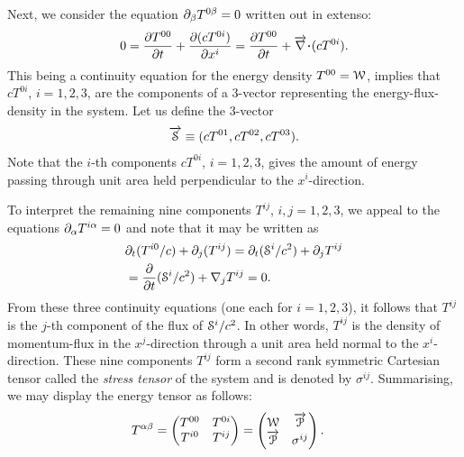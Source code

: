 Next, we consider the equation $\dow_\gkb T^{0\gkb}=0 $
written out in extenso:
\begin{align} \label{rcm.26}
0=\frac{\dow T^{00}}{\dow t} + \frac{\dow(c
T^{0i})}{\dow x^i}=\frac{\dow T^{00}}{\dow t} +
\vnab\dotp (cT^{0i}).
\end{align}
This being  a {continuity equation} for the energy density 
$T^{00}= \EuScript{W}$, implies that $c T^{0i}$, $i=1,2,3$, 
are the components of a {3-vector} representing the 
{energy-flux-density} in the system. Let  us define the 
3-vector   
\begin{align} \label{rcm.27} \vec{\EuScript{S}} \equiv 
(cT^{01},cT^{02},cT^{03}). \end{align} Note that the $i$-th 
components $c T^{0i} $, $i=1,2,3$, gives the amount of 
energy passing through unit area held  perpendicular to 
the $x^i$-direction.

To interpret the remaining nine components $ T^{ij}$,   
 $i,j=1,2,3$,  we appeal to the equations $\dow_\gka T^{i 
\gka} =0$ and note that it may be written as
\begin{align}\label{rcm.28}
&\dow_t (T^{i 0}/c) + \dow_j (T^{ij})=  \dow_t 
(\EuScript{S}^i/c^2)  + \dow_j T^{ij}\notag\\
& = \frac{\dow}{\dow t}(\EuScript{S}^i/c^2)  +
\nabla_jT^{ij}=0.
\end{align}
From these three continuity equations (one each for  
$i=1,2,3$), it follows that  $T^{ij}$ is the $j$-th 
component of  the flux of $\EuScript{S}^i /c^2 $. In other 
words, $T^{ij}$ is the density of momentum-flux in the $ 
x^j 
$-direction through a unit area held normal to the $ x^i 
$-direction. These nine components $T^{ij}$ form a second 
rank symmetric Cartesian tensor called the \textsl{stress 
tensor} of the system and is denoted by $\sigma^{ij}$. 
 Summarising,  we 
may display the energy tensor as follows:
\begin{align}\label{rcm.29}
T^{\gka\gkb}&=\begin{pmatrix}  T^{00}&T^{0i}\\
T^{i 0}&T^{ij}\end{pmatrix}  =\begin{pmatrix}
\EuScript{W}&
\vec{\EuScript{P}}\\
\vec{\EuScript{P}}&\sigma^{ij}\end{pmatrix} .
\end{align}

